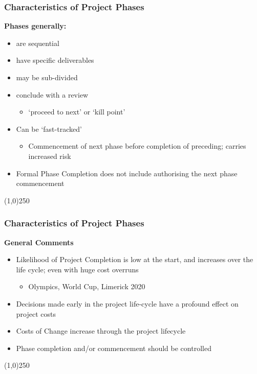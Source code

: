 \begin{frame}
\frametitle{Characteristics of Project Phases}
\textbf{Phases generally:}
\begin{itemize}
	\item are sequential
	\item have specific deliverables
	\item may be sub-divided
	\item conclude with a review
		\begin{itemize}
			\item `proceed to next' or `kill point'
		\end{itemize}
	\item Can be `fast-tracked'
		\begin{itemize}
			\item Commencement of next phase before completion of preceding; carries increased risk
		\end{itemize}
	\item Formal Phase Completion does not include authorising the next phase commencement
\end{itemize}
\end{frame}
\begin{center}\line(1,0){250}\end{center}



\begin{frame}
\frametitle{Characteristics of Project Phases}
\textbf{General Comments}\\
\begin{itemize}
	\item Likelihood of Project Completion is low at the start, and increases over the life cycle; even with huge cost overruns	
		\begin{itemize}
			\item Olympics, World Cup, Limerick 2020
		\end{itemize}
	\item Decisions made early in the project life-cycle have a profound effect on project costs
	\item Costs of Change increase through the project lifecycle
	\item Phase completion and/or commencement should be controlled
\end{itemize}
\end{frame}
\begin{center}\line(1,0){250}\end{center}



